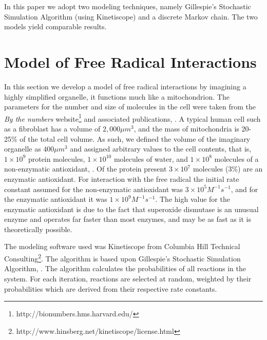 \documentclass[preprint,12pt,authoryear]{elsarticle}
\begin{document}
In this paper we adopt two modeling techniques, namely Gillespie's Stochastic Simulation Algorithm
(using Kinetiscope) and a discrete Markov chain. The two models yield comparable results.


\section{Model of Free Radical Interactions}

In this section we develop a model of free radical interactions 
by imagining a highly simplified organelle, it functions much like a
mitochondrion. The parameters for the number and size of molecules in the cell were taken from
the \emph{By the numbers} website\footnote{http://bionumbers.hms.harvard.edu/}
and associated publications, \citet{Milo:2015uq}. A typical human cell such as a fibroblast has a volume of $2,000 \mu m^3$, and the mass of mitochondria is 20-25\% of the total cell volume.
As such, we defined the volume of the imaginary organelle as $400 \mu m^3$ and assigned arbitrary values to the cell 
contents, that is, $1 \times 10^9$ protein molecules, $1 \times 10^{10}$
molecules of water, and $1 \times 10^8$ molecules of a non-enzymatic antioxidant, \citet{bergsten:1989}.
Of the protein present $3 \times 10^7$ molecules (3\%) are an enzymatic antioxidant.
For interaction with the free radical the initial rate constant assumed for the non-enzymatic antioxidant was
$3 \times 10^5 M^{-1} s^{-1}$, and for the enzymatic antioxidant it was $1 \times 10^ 9 M^{-1} s^{-1}$. 
The high value for the enzymatic antioxidant is due to the fact that superoxide dismutase is an unusual enzyme and operates far faster than most enzymes, and may be as fast as it is theoretically possible.


The  modeling software used was Kinetiscope from Columbia Hill Technical
Consulting\footnote{http://www.hinsberg.net/kinetiscope/license.html}. 
The algorithm is based upon Gillespie's Stochastic Simulation Algorithm,  \citet{Gillespie:2007bx}. 
The algorithm calculates the probabilities of all reactions in the system. 
For each iteration, reactions are selected at random, weighted by their probabilities which are 
derived from their respective rate constants.
\end{document}
